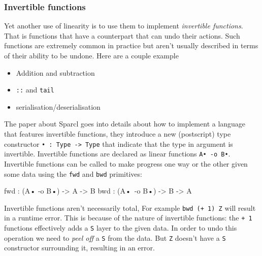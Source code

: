 \documentclass[
]{article}
\newenvironment{Shaded}{}{}
\newcommand{\DataTypeTok}[1]{\textcolor[rgb]{0.56,0.13,0.00}{#1}}
\newcommand{\NormalTok}[1]{#1}
\newcommand{\OperatorTok}[1]{\textcolor[rgb]{0.40,0.40,0.40}{#1}}
\newcommand{\OtherTok}[1]{\textcolor[rgb]{0.00,0.44,0.13}{#1}}
\providecommand{\tightlist}{%
  \setlength{\itemsep}{0pt}\setlength{\parskip}{0pt}}
\begin{document}
\hypertarget{invertible-functions}{%
\subsubsection{Invertible functions}\label{invertible-functions}}

Yet another use of linearity is to use them to implement
\emph{invertible functions}. That is functions that have a counterpart
that can undo their actions. Such functions are extremely common in
practice but aren't usually described in terms of their ability to be
undone. Here are a couple example

\begin{itemize}
\tightlist
\item
  Addition and subtraction
\item
  \texttt{::} and \texttt{tail}
\item
  serialisation/deserialisation
\end{itemize}

The paper about Sparcl\cite{invertible_functions} goes into details
about how to implement a language that features invertible functions,
they introduce a new (postscript) type constructor
\texttt{•\ :\ Type\ -\textgreater{}\ Type} that indicate that the type
in argument is invertible. Invertible functions are declared as linear
functions \texttt{A•\ -o\ B•}. Invertible functions can be called to
make progress one way or the other given some data using the
\texttt{fwd} and \texttt{bwd} primitives:

\begin{Shaded}
\begin{Highlighting}[]
\NormalTok{fwd }\OperatorTok{:}\NormalTok{ (}\DataTypeTok{A}\NormalTok{• }\OperatorTok{{-}}\NormalTok{o }\DataTypeTok{B}\NormalTok{•) }\OtherTok{{-}\textgreater{}} \DataTypeTok{A} \OtherTok{{-}\textgreater{}} \DataTypeTok{B}
\NormalTok{bwd }\OperatorTok{:}\NormalTok{ (}\DataTypeTok{A}\NormalTok{• }\OperatorTok{{-}}\NormalTok{o }\DataTypeTok{B}\NormalTok{•) }\OtherTok{{-}\textgreater{}} \DataTypeTok{B} \OtherTok{{-}\textgreater{}} \DataTypeTok{A}
\end{Highlighting}
\end{Shaded}

Invertible functions aren't necessarily total, For example
\texttt{bwd\ (+\ 1)\ Z} will result in a runtime error. This is because
of the nature of invertible functions: the \texttt{+\ 1} functions
effectively adds a \texttt{S} layer to the given data. In order to undo
this operation we need to \emph{peel off} a \texttt{S} from the data.
But \texttt{Z} doesn't have a \texttt{S} constructor surrounding it,
resulting in an error.
\end{document}
